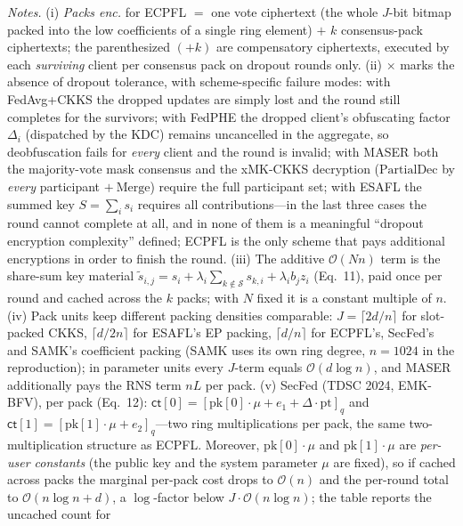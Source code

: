 \begin{table}[t]
\vspace{4pt}
\begin{minipage}{\linewidth}
\footnotesize
\emph{Notes.}
(i) \emph{Packs enc.} for ECPFL $=$ one vote ciphertext (the whole $J$-bit
bitmap packed into the low coefficients of a single ring element) $+$ $k$
consensus-pack ciphertexts; the parenthesized $(+k)$ are compensatory
ciphertexts, executed by each \emph{surviving} client per consensus pack on
dropout rounds only.
(ii) $\times$ marks the absence of dropout tolerance, with
scheme-specific failure modes: with FedAvg+CKKS the dropped updates are
simply lost and the round still completes for the survivors; with FedPHE
the dropped client's obfuscating factor $\Delta_i$ (dispatched by the KDC)
remains uncancelled in the aggregate, so deobfuscation fails for
\emph{every} client and the round is invalid; with MASER both the
majority-vote mask consensus and the xMK-CKKS decryption
($\mathrm{PartialDec}$ by \emph{every} participant $+\ \mathrm{Merge}$)
require the full participant set; with ESAFL the summed key
$S=\sum_i s_i$ requires all contributions---in the last three cases the
round cannot complete at all, and in none of them is a meaningful
``dropout encryption complexity'' defined; ECPFL is the only scheme that
pays additional encryptions in order to finish the round.
(iii) The additive $\mathcal{O}(Nn)$ term is the share-sum key material
$\tilde{s}_{i,j}=s_i+\lambda_i\sum_{k\notin\mathcal{S}}s_{k,i}
+\lambda_i b_j z_i$ (Eq.~11), paid once per round and cached across the $k$
packs; with $N$ fixed it is a constant multiple of $n$.
(iv) Pack units keep different packing densities comparable:
$J=\lceil 2d/n\rceil$ for slot-packed CKKS, $\lceil d/2n\rceil$ for ESAFL's
EP packing, $\lceil d/n\rceil$ for ECPFL's, SecFed's and SAMK's
coefficient packing (SAMK uses its own ring degree, $n=1024$ in the
reproduction); in
parameter units every $J$-term equals $\mathcal{O}(d\log n)$, and MASER
additionally pays the RNS term $nL$ per pack.
(v) SecFed (TDSC 2024, EMK-BFV), per pack (Eq.~12):
$\mathsf{ct}[0]=[\mathrm{pk}[0]\cdot\mu+e_1+\Delta\cdot\mathrm{pt}]_q$ and
$\mathsf{ct}[1]=[\mathrm{pk}[1]\cdot\mu+e_2]_q$---two ring multiplications
per pack, the same two-multiplication structure as ECPFL. Moreover,
$\mathrm{pk}[0]\cdot\mu$ and $\mathrm{pk}[1]\cdot\mu$ are \emph{per-user
constants} (the public key and the system parameter $\mu$ are fixed), so if
cached across packs the marginal per-pack cost drops to $\mathcal{O}(n)$
and the per-round total to $\mathcal{O}(n\log n+d)$, a $\log$-factor below
$J\cdot\mathcal{O}(n\log n)$; the table reports the uncached count for

\end{minipage}
\end{table}
